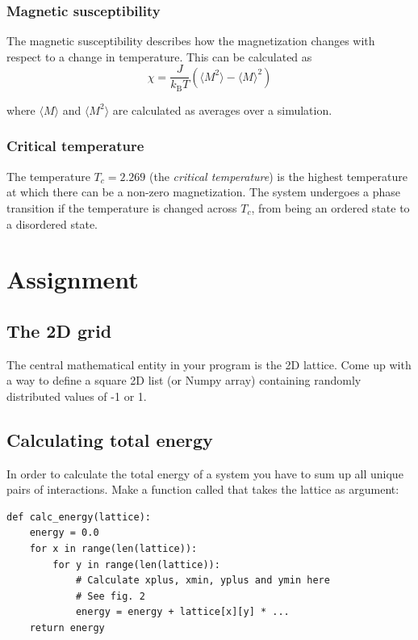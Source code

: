 \documentclass{article}
\begin{document}
\subsubsection{Magnetic susceptibility}

The magnetic susceptibility describes how the magnetization changes with respect to a change in temperature.
This can be calculated as
\begin{equation}
\chi = \frac{J}{k_{\mathrm{B}}T} \left( \langle M^2 \rangle - \langle M \rangle^2 \right)
\end{equation}

where $\langle M \rangle$ and $\langle M^2 \rangle$ are calculated as averages over a simulation.

\subsubsection{Critical temperature}

The temperature $T_c = 2.269$ (the \textit{critical temperature}) is the highest temperature at which there can be a non-zero magnetization.
The system undergoes a phase transition if the temperature is changed across $T_c$, from being an ordered state to a disordered state.

\newpage
\section{Assignment}
\subsection{The 2D grid}

The central mathematical entity in your program is the 2D lattice.
Come up with a way to define a square 2D list (or Numpy array) containing randomly distributed values of -1 or 1.

\subsection{Calculating total energy}

In order to calculate the total energy of a system you have to sum up all unique pairs of interactions. Make a function called  that takes the lattice as argument:

\begin{lstlisting}
def calc_energy(lattice):
    energy = 0.0
    for x in range(len(lattice)):
        for y in range(len(lattice)):
            # Calculate xplus, xmin, yplus and ymin here
            # See fig. 2
            energy = energy + lattice[x][y] * ...
    return energy
\end{lstlisting}
\end{document}
